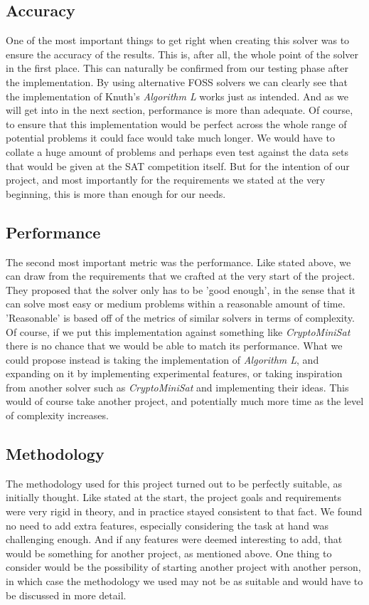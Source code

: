 \documentclass{article}
\begin{document}
\subsection{Accuracy}
One of the most important things to get right when creating this solver was to ensure the accuracy of the results. This is, after
all, the whole point of the solver in the first place. This can naturally be confirmed from our testing phase after the
implementation. By using alternative FOSS solvers we can clearly see that the implementation of Knuth's \textit{Algorithm L} works
just as intended. And as we will get into in the next section, performance is more than adequate. Of course, to ensure that this
implementation would be perfect across the whole range of potential problems it could face would take much longer. We would have
to collate a huge amount of problems and perhaps even test against the data sets that would be given at the SAT competition
itself. But for the intention of our project, and most importantly for the requirements we stated at the very beginning, this is
more than enough for our needs.

\subsection{Performance}
The second most important metric was the performance. Like stated above, we can draw from the requirements that we crafted at the
very start of the project. They proposed that the solver only has to be 'good enough', in the sense that it can solve most easy or
medium problems within a reasonable amount of time. 'Reasonable' is based off of the metrics of similar solvers in terms of
complexity. Of course, if we put this implementation against something like \textit{CryptoMiniSat} there is no chance that we
would be able to match its performance. What we could propose instead is taking the implementation of \textit{Algorithm L}, and
expanding on it by implementing experimental features, or taking inspiration from another solver such as \textit{CryptoMiniSat}
and implementing their ideas. This would of course take another project, and potentially much more time as the level of complexity
increases.

\subsection{Methodology}
The methodology used for this project turned out to be perfectly suitable, as initially thought. Like stated at the start, the
project goals and requirements were very rigid in theory, and in practice stayed consistent to that fact. We found no need to add
extra features, especially considering the task at hand was challenging enough. And if any features were deemed interesting to
add, that would be something for another project, as mentioned above. One thing to consider would be the possibility of starting
another project with another person, in which case the methodology we used may not be as suitable and would have to be discussed
in more detail.
\end{document}
